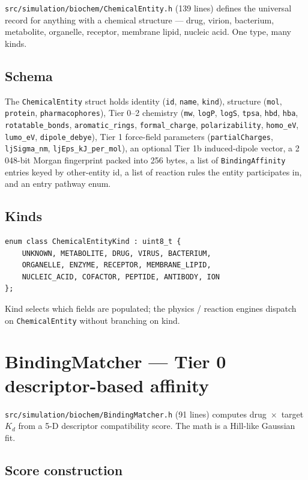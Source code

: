 \documentclass[11pt,letterpaper,twoside,openany]{book}
\newcommand{\code}[1]{\texttt{#1}}
\newcommand{\file}[1]{\texttt{\small#1}}
\begin{document}
\file{src/simulation/biochem/ChemicalEntity.h} (139 lines) defines
the universal record for anything with a chemical structure ---
drug, virion, bacterium, metabolite, organelle, receptor, membrane
lipid, nucleic acid. One type, many kinds.

\section{Schema}

The \code{ChemicalEntity} struct holds identity
(\code{id}, \code{name}, \code{kind}), structure
(\code{mol}, \code{protein}, \code{pharmacophores}), Tier 0--2
chemistry (\code{mw}, \code{logP}, \code{logS}, \code{tpsa},
\code{hbd}, \code{hba}, \code{rotatable\_bonds},
\code{aromatic\_rings}, \code{formal\_charge},
\code{polarizability}, \code{homo\_eV}, \code{lumo\_eV},
\code{dipole\_debye}), Tier 1 force-field parameters
(\code{partialCharges}, \code{ljSigma\_nm}, \code{ljEps\_kJ\_per\_mol}),
an optional Tier 1b induced-dipole vector, a 2\,048-bit Morgan
fingerprint packed into 256 bytes, a list of
\code{BindingAffinity} entries keyed by other-entity id, a list of
reaction rules the entity participates in, and an entry pathway
enum.

\section{Kinds}

\begin{lstlisting}
enum class ChemicalEntityKind : uint8_t {
    UNKNOWN, METABOLITE, DRUG, VIRUS, BACTERIUM,
    ORGANELLE, ENZYME, RECEPTOR, MEMBRANE_LIPID,
    NUCLEIC_ACID, COFACTOR, PEPTIDE, ANTIBODY, ION
};
\end{lstlisting}
Kind selects which fields are populated; the physics / reaction
engines dispatch on \code{ChemicalEntity} without branching on
kind.

\chapter{BindingMatcher --- Tier 0 descriptor-based affinity}
\label{ch:bmatcher}

\file{src/simulation/biochem/BindingMatcher.h} (91 lines) computes
drug~$\times$~target $K_d$ from a 5-D descriptor compatibility
score. The math is a Hill-like Gaussian fit.

\section{Score construction}
\end{document}
